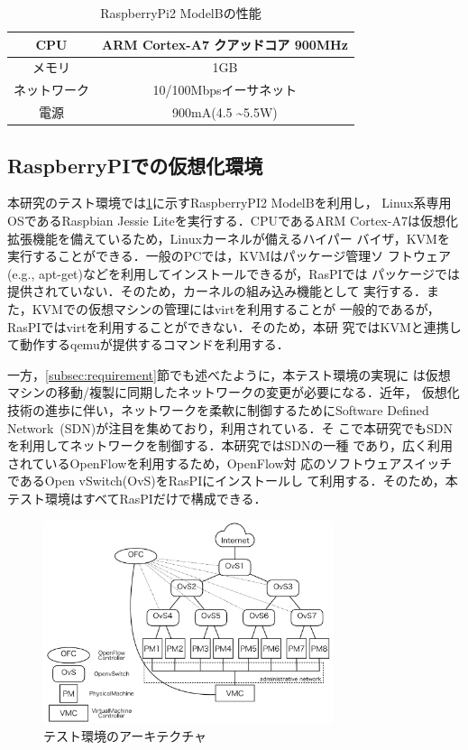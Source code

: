 \documentclass[submit,techrep]{ipsj}
\begin{document}
\begin{table}[tb]
	\centering
	\caption{RaspberryPi2 ModelBの性能}
	\label{tab:rpi2}
	{
		\small
		\begin{tabular}{|c|c|} \hline
		CPU & ARM Cortex-A7 クアッドコア 900MHz\\ \hline
		メモリ & 1GB\\ \hline
		ネットワーク & 10/100Mbpsイーサネット\\ \hline
		電源 & 900mA(4.5 \textasciitilde 5.5W)\\ \hline
		\end{tabular}
	}
\end{table}

\subsection{RaspberryPIでの仮想化環境}
本研究のテスト環境では\ref{tab:rpi2}に示すRaspberryPI2 ModelBを利用し，
Linux系専用OSであるRaspbian Jessie Liteを実行する．CPUであるARM
Cortex-A7は仮想化拡張機能を備えているため，Linuxカーネルが備えるハイパー
バイザ，KVMを実行することができる．一般のPCでは，KVMはパッケージ管理ソ
フトウェア(e.g., apt-get)などを利用してインストールできるが，RasPIでは
パッケージでは提供されていない．そのため，カーネルの組み込み機能として
実行する．また，KVMでの仮想マシンの管理にはvirt\cite{virt}を利用することが
一般的であるが，RasPIではvirtを利用することができない．そのため，本研
究ではKVMと連携して動作するqemuが提供するコマンドを利用する．

一方，\ref{subsec:requirement}節でも述べたように，本テスト環境の実現に
は仮想マシンの移動/複製に同期したネットワークの変更が必要になる．近年，
仮想化技術の進歩に伴い，ネットワークを柔軟に制御するためにSoftware
Defined Network~(SDN)\cite{sdn}が注目を集めており，利用されている．そ
こで本研究でもSDNを利用してネットワークを制御する．本研究ではSDNの一種
であり，広く利用されているOpenFlow\cite{opf}を利用するため，OpenFlow対
応のソフトウェアスイッチであるOpen vSwitch(OvS)をRasPIにインストールし
て利用する．そのため，本テスト環境はすべてRasPIだけで構成できる．

\begin{figure}[tb]
	\includegraphics[width=8.5cm,bb=0 0 850 557]{fig/topology.png}
	\caption{テスト環境のアーキテクチャ}
	\label{fig:topology}
\end{figure}
\end{document}
